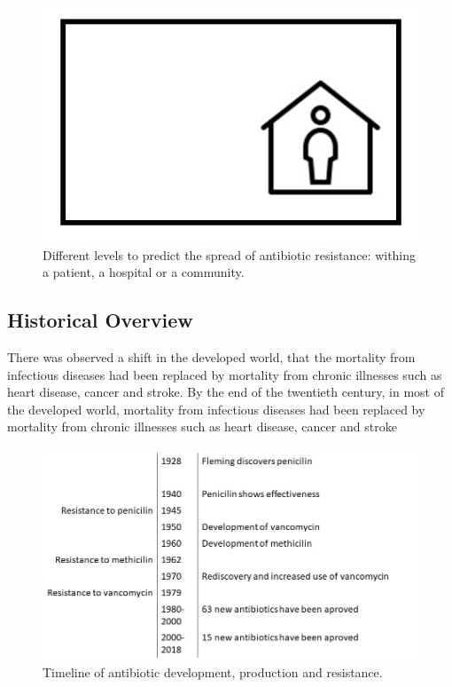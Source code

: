\documentclass[12pt]{article}
\begin{document}
\begin{figure}\includegraphics[width=\textwidth]{Images/distribution.jpg}\caption{Different levels to predict the spread of antibiotic resistance: withing a patient, a hospital or a community.}
	\end{figure}


\subsection{Historical Overview}
There was observed a shift in the developed world, that the mortality from infectious diseases had been replaced by mortality from chronic illnesses such as heart disease, cancer and stroke. By the end of the twentieth century, in most of the developed world, mortality from infectious diseases had been replaced by mortality from chronic illnesses such as heart disease, cancer and stroke~\cite{Dasbas.2016}
\begin{figure}\includegraphics[width=\textwidth]{Images/History.jpg}\caption{Timeline of antibiotic development, production and resistance.}
\end{figure}
\end{document}
